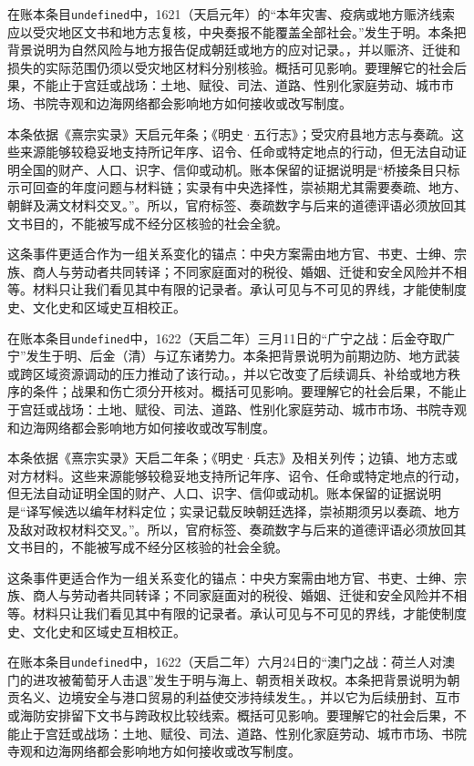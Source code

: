 在账本条目\texttt{undefined}中，1621（天启元年）的“本年灾害、疫病或地方赈济线索应以受灾地区文书和地方志复核，中央奏报不能覆盖全部社会。”发生于明。本条把背景说明为自然风险与地方报告促成朝廷或地方的应对记录。，并以赈济、迁徙和损失的实际范围仍须以受灾地区材料分别核验。概括可见影响。要理解它的社会后果，不能止于宫廷或战场：土地、赋役、司法、道路、性别化家庭劳动、城市市场、书院寺观和边海网络都会影响地方如何接收或改写制度。

本条依据《熹宗实录》天启元年条；《明史·五行志》；受灾府县地方志与奏疏。这些来源能够较稳妥地支持所记年序、诏令、任命或特定地点的行动，但无法自动证明全国的财产、人口、识字、信仰或动机。账本保留的证据说明是“桥接条目只标示可回查的年度问题与材料链；实录有中央选择性，崇祯期尤其需要奏疏、地方、朝鲜及满文材料交叉。”。所以，官府标签、奏疏数字与后来的道德评语必须放回其文书目的，不能被写成不经分区核验的社会全貌。

这条事件更适合作为一组关系变化的锚点：中央方案需由地方官、书吏、士绅、宗族、商人与劳动者共同转译；不同家庭面对的税役、婚姻、迁徙和安全风险并不相等。材料只让我们看见其中有限的记录者。承认可见与不可见的界线，才能使制度史、文化史和区域史互相校正。

在账本条目\texttt{undefined}中，1622（天启二年）三月11日的“广宁之战：后金夺取广宁”发生于明、后金（清）与辽东诸势力。本条把背景说明为前期边防、地方武装或跨区域资源调动的压力推动了该行动。，并以它改变了后续调兵、补给或地方秩序的条件；战果和伤亡须分开核对。概括可见影响。要理解它的社会后果，不能止于宫廷或战场：土地、赋役、司法、道路、性别化家庭劳动、城市市场、书院寺观和边海网络都会影响地方如何接收或改写制度。

本条依据《熹宗实录》天启二年条；《明史·兵志》及相关列传；边镇、地方志或对方材料。这些来源能够较稳妥地支持所记年序、诏令、任命或特定地点的行动，但无法自动证明全国的财产、人口、识字、信仰或动机。账本保留的证据说明是“译写候选以编年材料定位；实录记载反映朝廷选择，崇祯期须另以奏疏、地方及敌对政权材料交叉。”。所以，官府标签、奏疏数字与后来的道德评语必须放回其文书目的，不能被写成不经分区核验的社会全貌。

这条事件更适合作为一组关系变化的锚点：中央方案需由地方官、书吏、士绅、宗族、商人与劳动者共同转译；不同家庭面对的税役、婚姻、迁徙和安全风险并不相等。材料只让我们看见其中有限的记录者。承认可见与不可见的界线，才能使制度史、文化史和区域史互相校正。

在账本条目\texttt{undefined}中，1622（天启二年）六月24日的“澳门之战：荷兰人对澳门的进攻被葡萄牙人击退”发生于明与海上、朝贡相关政权。本条把背景说明为朝贡名义、边境安全与港口贸易的利益使交涉持续发生。，并以它为后续册封、互市或海防安排留下文书与跨政权比较线索。概括可见影响。要理解它的社会后果，不能止于宫廷或战场：土地、赋役、司法、道路、性别化家庭劳动、城市市场、书院寺观和边海网络都会影响地方如何接收或改写制度。

